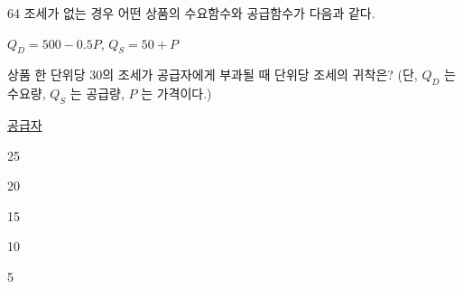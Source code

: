 \begin{question}{64}
조세가 없는 경우 어떤 상품의 수요함수와 공급함수가 다음과 같다.
\begin{center}$Q_{ D } =500-0.5P$, $Q_{ S } =50+P$\end{center}
상품 한 단위당 30의 조세가 공급자에게 부과될 때 단위당 조세의 귀착은? (단, $Q_{ D }$ 는 수요량, $Q_{ S }$ 는 공급량, $P$ 는 가격이다.)

\noindent\hspace*{2em}\uline{공급자}\par
\begin{choices}
  \item {}25
  \item {}20
  \item {}15
  \item {}10
  \item {}5
\end{choices}
\end{question}
